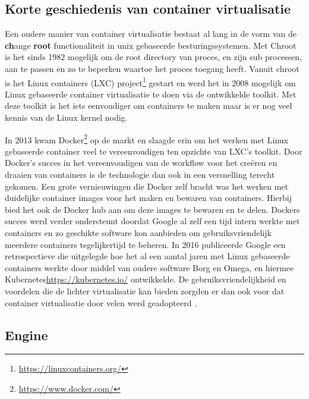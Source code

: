 \subsection{Korte geschiedenis van container virtualisatie}

Een oudere manier van container virtualisatie bestaat al lang in de vorm van de \textbf{ch}ange \textbf{root} functionaliteit in unix gebaseerde besturingssystemen. Met Chroot is het sinds 1982 mogelijk om de root directory van proces, en zijn sub processen, aan te passen en zo te beperken  waartoe het proces toegang heeft. Vanuit chroot is het Linux containers (LXC) project\footnote{\url{https://linuxcontainers.org/}} gestart en werd het in 2008 mogelijk om Linux gebaseerde container virtualisatie te doen via de ontwikkelde toolkit. Met deze toolkit is het iets eenvoudiger om containers te maken maar is er nog veel kennis van de Linux kernel nodig\autocite{Eder2016,SenthilKumaran2017}.

In 2013 kwam Docker\footnote{\url{https://www.docker.com/}} op de markt en slaagde erin om het werken met Linux gebaseerde container veel te vereenvoudigen ten opzichte van LXC’s toolkit\autocite{Hykes2013}. Door Docker’s succes in het vereenvoudigen van de workflow voor het creëren en draaien van containers is de technologie dan ook in een versnelling terecht gekomen.  Een grote vernieuwingen die Docker zelf bracht was het werken met duidelijke container images voor het maken en bewaren van containers. Hierbij bied het ook de Docker hub aan om deze images te bewaren en te delen. Dockers succes werd verder ondersteunt doordat Google al zelf een tijd intern werkte met containers en zo geschikte software kon aanbieden om gebruiksvriendelijk  meerdere containers tegelijkertijd te beheren. In 2016 publiceerde Google een retrospectieve die uitgelegde hoe het al een aantal jaren met Linux gebaseerde containers werkte door middel van oudere software Borg en Omega, en hiermee Kubernetes{\url{https://kubernetes.io/}} ontwikkelde. De gebruiksvriendelijkheid en voordelen die de lichter virtualisatie kan bieden zorgden er dan ook voor dat container virtualisatie door velen werd geadopteerd \autocite{Eder2016}.

\subsection{Engine}

